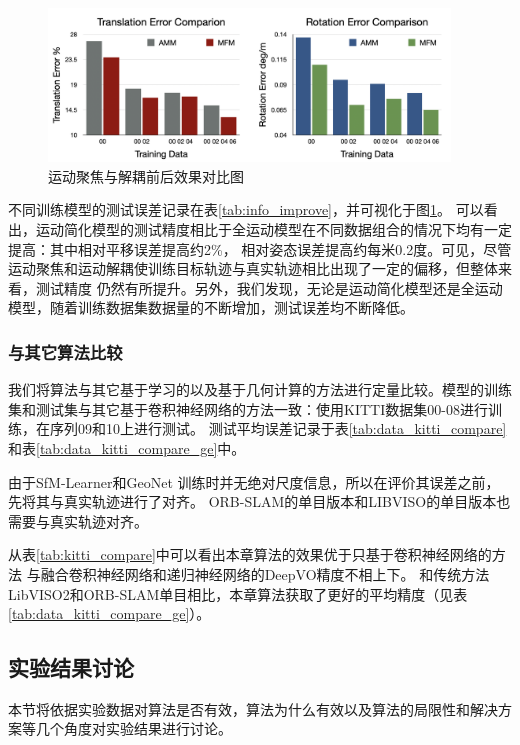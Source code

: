 \begin{figure}[ht]
    \centering
    \includegraphics[width=0.95\textwidth]{datavo/focusing_train.png}
    \caption{运动聚焦与解耦前后效果对比图}
    \label{fig:focucing_train}
\end{figure}
不同训练模型的测试误差记录在表\ref{tab:info_improve}，并可视化于图\ref{fig:focucing_train}。
可以看出，运动简化模型的测试精度相比于全运动模型在不同数据组合的情况下均有一定提高：其中相对平移误差提高约2\%，
相对姿态误差提高约每米0.2度。可见，尽管运动聚焦和运动解耦使训练目标轨迹与真实轨迹相比出现了一定的偏移，但整体来看，测试精度
仍然有所提升。另外，我们发现，无论是运动简化模型还是全运动模型，随着训练数据集数据量的不断增加，测试误差均不断降低。

\subsubsection{与其它算法比较}
\label{sec:compare}

我们将算法与其它基于学习的以及基于几何计算的方法进行定量比较。模型的训练集和测试集与其它基于卷积神经网络的方法\cite{zhan2018unsupervised,zhou2017unsupervised,yin2018geonet}一致：使用KITTI数据集00-08进行训练，在序列09和10上进行测试。
测试平均误差记录于表\ref{tab:data_kitti_compare}和表\ref{tab:data_kitti_compare_ge}中。

由于SfM-Learner\cite{zhou2017unsupervised}和GeoNet \cite{yin2018geonet}训练时并无绝对尺度信息，所以在评价其误差之前，先将其与真实轨迹进行了对齐。
ORB-SLAM\cite{raul2015orb}的单目版本和LIBVISO\cite{Geiger2011IV}的单目版本也需要与真实轨迹对齐。

从表\ref{tab:kitti_compare}中可以看出本章算法的效果优于只基于卷积神经网络的方法\cite{zhan2018unsupervised,zhou2017unsupervised,yin2018geonet} 与融合卷积神经网络和递归神经网络的DeepVO\cite{wang2017deepvo}精度不相上下。
和传统方法LibVISO2\cite{Geiger2011IV}和ORB-SLAM单目\cite{raul2015orb}相比，本章算法获取了更好的平均精度（见表\ref{tab:data_kitti_compare_ge}）。

\subsection{实验结果讨论}
本节将依据实验数据对算法是否有效，算法为什么有效以及算法的局限性和解决方案等几个角度对实验结果进行讨论。
